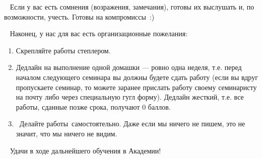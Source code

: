 \documentclass[a4paper,12pt]{article}
\theoremstyle{plain} %
\theoremstyle{definition} %
\theoremstyle{remark} %
\begin{document}
 
Если у вас есть сомнения (возражения, замечания), готовы их выслушать и, по возможности, учесть. Готовы на компромиссы :)

 
Наконец, у нас для вас есть организационные пожелания:

\begin{enumerate}
	\item Скрепляйте работы степлером. 
\item Дедлайн на выполнение одной домашки --- ровно одна неделя, т.е. перед началом следующего семинара вы должны будете сдать работу (если вы вдруг пропускаете семинар, то можете заранее прислать работу своему семинаристу на почту либо через специальную гугл форму). Дедлайн жесткий, т.е. все работы, сданные позже срока, получают $0$ баллов. 
\item  Делайте работы самостоятельно. Даже если мы ничего не пишем, это не значит, что мы ничего не видим.
\end{enumerate}


 
Удачи в ходе дальнейшего обучения в Академии!  

       
\end{document}
